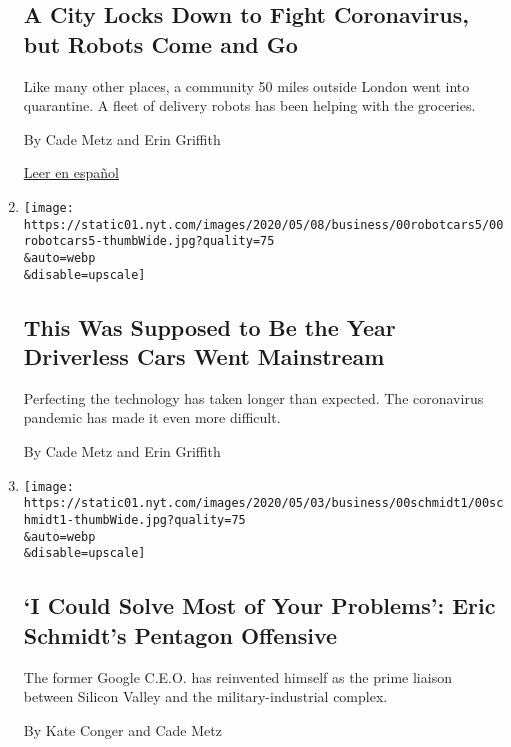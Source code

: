 \begin{enumerate}
  \hypertarget{a-city-locks-down-to-fight-coronavirus-but-robots-come-and-go}{%
  \subsection{A City Locks Down to Fight Coronavirus, but Robots Come
  and
  Go}\label{a-city-locks-down-to-fight-coronavirus-but-robots-come-and-go}}

  Like many other places, a community 50 miles outside London went into
  quarantine. A fleet of delivery robots has been helping with the
  groceries.

  By Cade Metz and Erin Griffith

  \href{https://www.nytimes.com/es/2020/05/21/espanol/ciencia-y-tecnologia/pandemia-robots-delivery.html}{Leer
  en español}
\item
  \href{/2020/05/12/technology/self-driving-cars-coronavirus.html}{}

  \texttt{[image: https://static01.nyt.com/images/2020/05/08/business/00robotcars5/00robotcars5-thumbWide.jpg?quality=75\\\&auto=webp\\\&disable=upscale]}

  \hypertarget{this-was-supposed-to-be-the-year-driverless-cars-went-mainstream}{%
  \subsection{This Was Supposed to Be the Year Driverless Cars Went
  Mainstream}\label{this-was-supposed-to-be-the-year-driverless-cars-went-mainstream}}

  Perfecting the technology has taken longer than expected. The
  coronavirus pandemic has made it even more difficult.

  By Cade Metz and Erin Griffith
\item
  \href{/2020/05/02/technology/eric-schmidt-pentagon-google.html}{}

  \texttt{[image: https://static01.nyt.com/images/2020/05/03/business/00schmidt1/00schmidt1-thumbWide.jpg?quality=75\\\&auto=webp\\\&disable=upscale]}

  \hypertarget{i-could-solve-most-of-your-problems-eric-schmidts-pentagon-offensive}{%
  \subsection{`I Could Solve Most of Your Problems': Eric Schmidt's
  Pentagon
  Offensive}\label{i-could-solve-most-of-your-problems-eric-schmidts-pentagon-offensive}}

  The former Google C.E.O. has reinvented himself as the prime liaison
  between Silicon Valley and the military-industrial complex.

  By Kate Conger and Cade Metz
\end{enumerate}

